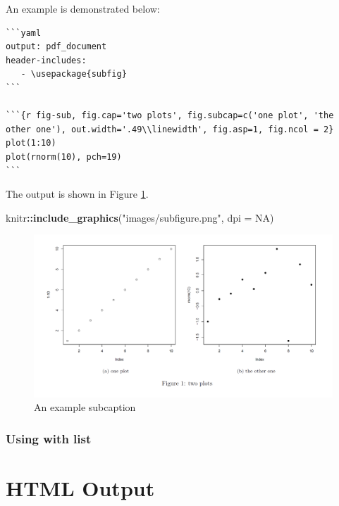 \documentclass[]{book}
\newenvironment{Shaded}{\begin{snugshade}}{\end{snugshade}}
\newcommand{\DataTypeTok}[1]{\textcolor[rgb]{0.13,0.29,0.53}{#1}}
\newcommand{\KeywordTok}[1]{\textcolor[rgb]{0.13,0.29,0.53}{\textbf{#1}}}
\newcommand{\NormalTok}[1]{#1}
\newcommand{\OperatorTok}[1]{\textcolor[rgb]{0.81,0.36,0.00}{\textbf{#1}}}
\newcommand{\OtherTok}[1]{\textcolor[rgb]{0.56,0.35,0.01}{#1}}
\newcommand{\StringTok}[1]{\textcolor[rgb]{0.31,0.60,0.02}{#1}}
\theoremstyle{definition}
\theoremstyle{definition}
\theoremstyle{definition}
\theoremstyle{remark}
\begin{document}
An example is demonstrated below:

\begin{verbatim}
```yaml
output: pdf_document
header-includes:
   - \usepackage{subfig}
```

```{r fig-sub, fig.cap='two plots', fig.subcap=c('one plot', 'the other one'), out.width='.49\\linewidth', fig.asp=1, fig.ncol = 2}
plot(1:10)
plot(rnorm(10), pch=19)
```
\end{verbatim}

The output is shown in Figure \ref{fig:subcaptions}.

\begin{Shaded}
\begin{Highlighting}[]
\NormalTok{knitr}\OperatorTok{::}\KeywordTok{include_graphics}\NormalTok{(}\StringTok{"images/subfigure.png"}\NormalTok{, }\DataTypeTok{dpi =} \OtherTok{NA}\NormalTok{)}
\end{Highlighting}
\end{Shaded}

\begin{figure}
\centering
\includegraphics{images/subfigure.png}
\caption{\label{fig:subcaptions}An example subcaption}
\end{figure}

\hypertarget{using-with-list}{%
\subsection{Using with list}\label{using-with-list}}

\hypertarget{html-output}{%
\chapter{HTML Output}\label{html-output}}
\end{document}
